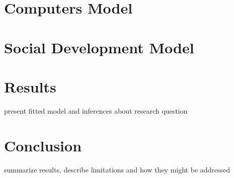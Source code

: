 \documentclass[12pt]{article}
\begin{document}
\section{Computers Model}




\section{Social Development Model}



\section{Results}
present fitted model and inferences about research question



\section{Conclusion}
summarize results, describe limitations and how they might be addressed



\theendnotes
\end{document}
